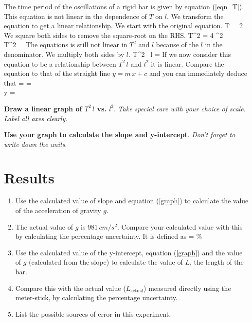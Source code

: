 \documentclass{article}
\begin{document}
      The time period of the oscillations of a rigid bar is given by equation (\ref{eqn_T}). This equation is not linear in the dependence of $T$ on $l$. We transform the equation to get a linear relationship. We start with the original equation.
%
      \beqn
         T = 2 \pi {}
      \eeqn
      We square both sides to remove the square-root on the RHS.
      \beqsn
         T^2 = 4 \pi^2  \\[0.25\baselineskip]
         \imply T^2 =  
      \eeqsn
      The equations is still not linear in $T^2$ and $l$ because of the $l$ in the denominator. We multiply both sides by $l$.
      \beq
         T^2 \, l =  
      \eeq
      If we now consider this equation to be a relationship between $T^2 \, l$ and $l^2$ it is linear. Compare the equation to that of the straight line $y = m \, x + c$ and you can immediately deduce that
      \beqc \label{graph}
          =  = \\[0.5\baselineskip]
         y = 
      \eeqc

      \textbf{Draw a linear graph of $T^2 \, l$ vs. $l^2$}. \textit{Take special care with your choice of scale. Label all axes clearly.}

      \textbf{Use your graph to calculate the slope and y-intercept}. \textit{Don't forget to write down the units}.


   \section*{Results}

      \begin{enumerate}

         \item Use the calculated value of slope and equation (\ref{graph}) to calculate the value of the acceleration of gravity $g$.
         
         \item The actual value of $g$ is $981 \, cm/s^2$. Compare your calculated value with this by calculating the percentage uncertainty. It is defined as
         \beq
          =   \%
         \eeq

         \item Use the calculated value of the y-intercept, equation (\ref{graph}) and the value of $g$ (calculated from the slope) to calculate the value of $L$, the length of the bar.

         \item Compare this with the actual value ($L_\text{actual}$) measured directly using the meter-stick, by calculating the percentage uncertainty.

         \item List the possible sources of error in this experiment.

   \end{enumerate}
\end{document}
